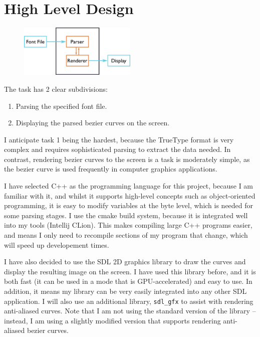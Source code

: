 \documentclass{report}
\begin{document}
\section{High Level Design}

\begin{figure}
  \centering
  \includegraphics[width=0.5\textwidth]{design/highlevelout}
\end{figure}

The task has 2 clear subdivisions:
\begin{enumerate}
\item{Parsing the specified font file.}
\item{Displaying the parsed bezier curves on the screen.}
\end{enumerate}


I anticipate task 1 being the hardest, because the TrueType format is very
complex and requires sophisticated parsing to extract the data needed. In
contrast, rendering bezier curves to the screen is a task is moderately simple,
as the bezier curve is used frequently in computer graphics applications.

I have selected C++ as the programming language for this project, because I am
familiar with it, and whilst it supports high-level concepts such as
object-oriented programming, it is easy to modify variables at the byte level,
which is needed for some parsing stages. I use the cmake build system, because
it is integrated well into my tools (Intellij CLion). This makes compiling large
C++ programs easier, and means I only need to recompile sections of my program
that change, which will speed up developement times.

I have also decided to use the SDL 2D graphics library to draw the curves and display the
resulting image on the screen. I have used this library before, and it is both
fast (it can be used in a mode that is GPU-accelerated) and easy to use. In
addition, it means my library can be very easily integrated into any other SDL
application. I will also use an additional library, \texttt{sdl\_gfx} to assist
with rendering anti-aliased curves. Note that I am not using the standard
version of the library -- instead, I am using a slightly modified version that
supports rendering anti-aliased bezier curves.
\end{document}
